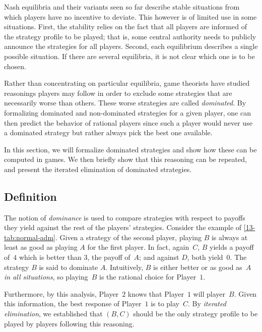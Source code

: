 Nash equilibria and their variants seen so far describe stable situations
from which players have no incentive to deviate. This however is of limited use
in some situations. First, the stability relies on the fact that all players are informed
of the strategy profile to be played; that is, some central authority needs to publicly
announce the strategies for all players. Second, each equilibrium describes a single possible
situation. If there are several equilibria, it is not clear which one is to be chosen.

Rather than concentrating on particular equilibria, game theorists have studied
reasonings players may follow in order to exclude some strategies that are necessarily worse than others.
These worse strategies are called \emph{dominated}.
By formalizing dominated and non-dominated strategies for a given player, one can then predict the behavior of rational players
since such a player would never use a dominated strategy but rather always pick the best one available.

In this section, we will formalize dominated strategies and show how these can be computed in games.
We then briefly show that this reasoning can be repeated, and present the iterated elimination of dominated strategies.

\subsection{Definition}\label{definition-1}
The notion of \emph{dominance} is used to compare strategies 
with respect to payoffs they yield against the rest of the players' strategies.
Consider the example of \cref{13-tab:normal-adm}.
Given a strategy of the second player, playing $B$ is always at least as good
as playing $A$ for the first player.
In fact, again~$C$, $B$ yields a payoff of~$4$ which is better than $3$, the payoff of~$A$;
and against $D$, both yield~$0$.
The strategy $B$ is said to dominate $A$. Intuitively, 
$B$ is either better or as good as~$A$ \emph{in all situations}, so 
playing~$B$ is the rational choice for Player~$1$.

Furthermore, by this analysis, Player~$2$ knows that Player~$1$ will player~$B$.
Given this information, the best response of Player~$1$ is to play~$C$.
By \emph{iterated elimination}, we established that
$(B, C)$ should be the only strategy profile to be played by players following this reasoning.

